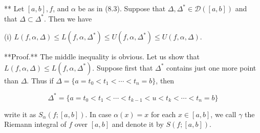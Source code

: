 ** Let $[a, b], f$, and $\alpha$ be as in (8.3). Suppose that $\Delta, \Delta^* \in \mathcal{D}([a, b])$ and that $\Delta \subset \Delta^*$. Then we have

(i) $L(f, \alpha, \Delta) \leq L(f, \alpha, \Delta^*) \leq U(f, \alpha, \Delta^*) \leq U(f, \alpha, \Delta)$.

**Proof.** The middle inequality is obvious. Let us show that $L(f, \alpha, \Delta) \leq L(f, \alpha, \Delta^*)$. Suppose first that $\Delta^*$ contains just one more point than $\Delta$. Thus if $\Delta = \{a = t_0 < t_1 < \cdots < t_n = b\}$, then

$$\Delta^* = \{a = t_0 < t_1 < \cdots < t_{k-1} < u < t_k < \cdots < t_n = b\}$$

write it as $S_{\alpha}(f; [a, b])$. In case $\alpha(x) = x$ for each $x \in [a, b]$, we call $\gamma$ the Riemann integral of $f$ over $[a, b]$ and denote it by $S(f; [a, b])$.